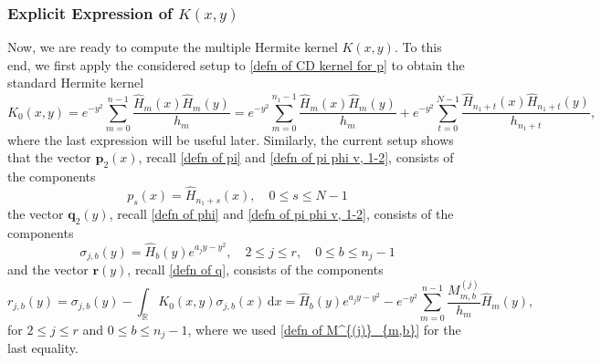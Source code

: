 \documentclass[a4paper,10pt,leqno]{amsart}
\numberwithin{equation}{section}
\theoremstyle{remark}
\newcommand{\dd}{\mathrm{d}}
\begin{document}
\subsubsection{Explicit Expression of $K(x,y)$}

Now, we are ready to compute the multiple Hermite kernel $K(x,y)$. To this end, we first apply the considered setup to \eqref{defn of CD kernel for p} to obtain the standard Hermite kernel
\begin{equation} \label{eq:K0-proof-3.4}
K_0(x,y) = e^{-y^2}\sum_{m=0}^{n-1}\frac{\widehat H_m(x)\widehat H_m(y)}{h_m} = e^{-y^2}\sum_{m=0}^{n_1-1}\frac{\widehat H_m(x)\widehat H_m(y)}{h_m} + e^{-y^2}\sum_{t=0}^{N-1}\frac{\widehat H_{n_1+t}(x)\widehat H_{n_1+t}(y)}{h_{n_1+t}},
\end{equation}
where the last expression will be useful later.
Similarly, the current setup shows that the vector $\bm p_2(x)$, recall \eqref{defn of pi} and \eqref{defn of pi phi v, 1-2}, consists of the components
\begin{equation}\label{eq:residual-proof-p}
    p_s(x) = \widehat H_{n_1 + s}(x), \quad 0 \leq s \leq N-1
\end{equation}
the vector $\bm q_2(y)$, recall \eqref{defn of phi} and \eqref{defn of pi phi v, 1-2}, consists of the components
\begin{equation}
    \sigma_{j,b}(y) = \widehat H_b(y)e^{a_jy-y^2}, \quad 2 \leq j \leq r, \quad 0\leq b\leq n_j-1
\end{equation}
and the vector $\bm r(y)$, recall \eqref{defn of q}, consists of the components
\begin{equation}\label{eq:residual-proof}
    r_{j,b}(y)=\sigma_{j,b}(y)-\int_{\mathbb R}K_0(x,y) \sigma_{j,b}(x)\,\dd x
    = \widehat H_b(y)e^{a_jy-y^2}-e^{-y^2}\sum_{m=0}^{n-1}\frac{M^{(j)}_{m,b}}{h_m}\widehat H_m(y), 
\end{equation}
for $2 \leq j \leq r$ and $0\leq b\leq n_j-1$, where we used \eqref{defn of M^{(j)}_{m,b}} for the last equality. 
\end{document}
